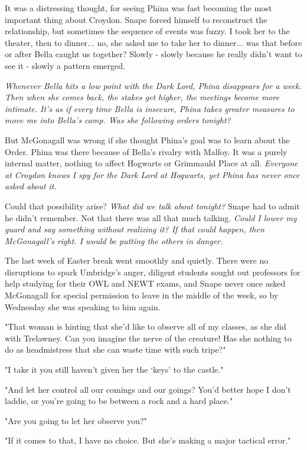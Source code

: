 It was a distressing thought, for seeing Phina was fast becoming the most important thing about Croydon. Snape forced himself to reconstruct the relationship, but sometimes the sequence of events was fuzzy. I took her to the theater, then to dinner... no, she asked me to take her to dinner... was that before or after Bella caught us together? Slowly - slowly because he really didn't want to see it - slowly a pattern emerged.

\emph{Whenever Bella hits a low point with the Dark Lord, Phina disappears for a week. Then when she comes back, the stakes get higher, the meetings become more intimate. It's as if every time Bella is insecure, Phina takes greater measures to move me into Bella's camp. Was she following orders tonight?}

But McGonagall was wrong if she thought Phina's goal was to learn about the Order. Phina was there because of Bella's rivalry with Malfoy. It was a purely internal matter, nothing to affect Hogwarts or Grimmauld Place at all. \emph{Everyone at Croydon knows I spy for the Dark Lord at Hogwarts, yet Phina has never once asked about it.}

Could that possibility arise? \emph{What did we talk about tonight?} Snape had to admit he didn't remember. Not that there was all that much talking. \emph{Could I lower my guard and say something without realizing it? If that could happen, then McGonagall's right. I would be putting the others in danger.}

The last week of Easter break went smoothly and quietly. There were no disruptions to spark Umbridge's anger, diligent students sought out professors for help studying for their OWL and NEWT exams, and Snape never once asked McGonagall for special permission to leave in the middle of the week, so by Wednesday she was speaking to him again.

"That woman is hinting that she'd like to observe all of my classes, as she did with Trelawney. Can you imagine the nerve of the creature! Has she nothing to do as headmistress that she can waste time with such tripe?"

"I take it you still haven't given her the `keys' to the castle."

"And let her control all our comings and our goings? You'd better hope I don't laddie, or you're going to be between a rock and a hard place."

"Are you going to let her observe you?"

"If it comes to that, I have no choice. But she's making a major tactical error."


